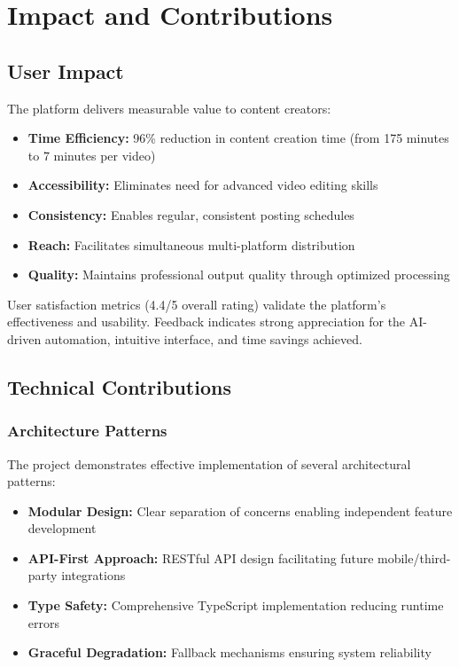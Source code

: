 \section{Impact and Contributions}

\subsection{User Impact}

The platform delivers measurable value to content creators:

\begin{itemize}
    \item \textbf{Time Efficiency:} 96\% reduction in content creation time (from 175 minutes to 7 minutes per video)
    \item \textbf{Accessibility:} Eliminates need for advanced video editing skills
    \item \textbf{Consistency:} Enables regular, consistent posting schedules
    \item \textbf{Reach:} Facilitates simultaneous multi-platform distribution
    \item \textbf{Quality:} Maintains professional output quality through optimized processing
\end{itemize}

User satisfaction metrics (4.4/5 overall rating) validate the platform's effectiveness and usability. Feedback indicates strong appreciation for the AI-driven automation, intuitive interface, and time savings achieved.

\subsection{Technical Contributions}

\subsubsection{Architecture Patterns}

The project demonstrates effective implementation of several architectural patterns:

\begin{itemize}
    \item \textbf{Modular Design:} Clear separation of concerns enabling independent feature development
    \item \textbf{API-First Approach:} RESTful API design facilitating future mobile/third-party integrations
    \item \textbf{Type Safety:} Comprehensive TypeScript implementation reducing runtime errors
    \item \textbf{Graceful Degradation:} Fallback mechanisms ensuring system reliability
\end{itemize}

